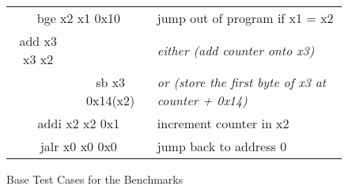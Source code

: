 \begin{figure}
    \centering
    \begin{tabular}{c | c >{\slshape}l}
        \multicolumn{2}{c}{\ttfamily bge x2 x1 0x10} & jump out of program if x1 = x2                                                     \\
        \ttfamily add x3 x3 x2                       &                                & either (add counter onto x3)                      \\
                                                     & \ttfamily sb x3 0x14(x2)       & or (store the first byte of x3 at counter + 0x14) \\
        \multicolumn{2}{c}{\ttfamily addi x2 x2 0x1} & increment counter in x2                                                            \\
        \multicolumn{2}{c}{\ttfamily jalr x0 x0 0x0} & jump back to address 0                                                             \\
    \end{tabular}
    \caption[Base Test Cases for Benchmarks]{Base Test Cases for the Benchmarks}\label{fig:base_test_risc}
\end{figure}
